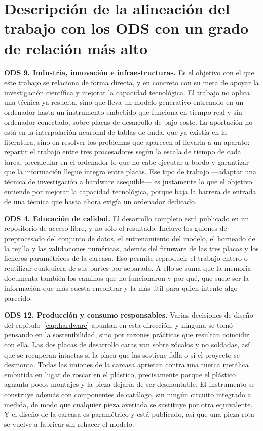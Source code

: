 \section*{Descripción de la alineación del trabajo con los ODS con un grado de
relación más alto}

\textbf{ODS 9. Industria, innovación e infraestructuras.} Es el objetivo con el
que este trabajo se relaciona de forma directa, y en concreto con su meta de
apoyar la investigación científica y mejorar la capacidad tecnológica. El
trabajo no aplica una técnica ya resuelta, sino que lleva un modelo generativo
entrenado en un ordenador hasta un instrumento embebido que funciona en tiempo
real y sin ordenador conectado, sobre placas de desarrollo de bajo coste. La
aportación no está en la interpolación neuronal de tablas de onda, que ya
existía en la literatura, sino en resolver los problemas que aparecen al
llevarla a un aparato: repartir el trabajo entre tres procesadores según la
escala de tiempo de cada tarea, precalcular en el ordenador lo que no cabe
ejecutar a bordo y garantizar que la información llegue íntegra entre placas.
Ese tipo de trabajo —adaptar una técnica de investigación a hardware asequible—
es justamente lo que el objetivo entiende por mejorar la capacidad tecnológica,
porque baja la barrera de entrada de una técnica que hasta ahora exigía un
ordenador dedicado.

\textbf{ODS 4. Educación de calidad.} El desarrollo completo está publicado en
un repositorio de acceso libre, y no sólo el resultado. Incluye los guiones de
preprocesado del conjunto de datos, el entrenamiento del modelo, el horneado de
la rejilla y las validaciones numéricas, además del firmware de las tres placas
y los ficheros paramétricos de la carcasa. Eso permite reproducir el trabajo
entero o reutilizar cualquiera de sus partes por separado. A ello se suma que la
memoria documenta también los caminos que no funcionaron y por qué, que suele
ser la información que más cuesta encontrar y la más útil para quien intente algo
parecido.

\textbf{ODS 12. Producción y consumo responsables.} Varias decisiones de diseño
del capítulo~\ref{cap:hardware} apuntan en esta dirección, y ninguna se tomó
pensando en la sostenibilidad, sino por razones prácticas que resultan coincidir
con ella. Las dos placas de desarrollo caras van sobre zócalos y no soldadas,
así que se recuperan intactas si la placa que las sostiene falla o si el
proyecto se desmonta. Todas las uniones de la carcasa aprietan contra una tuerca
metálica embutida en lugar de roscar en el plástico, precisamente porque el
plástico aguanta pocos montajes y la pieza dejaría de ser desmontable. El
instrumento se construye además con componentes de catálogo, sin ningún circuito
integrado a medida, de modo que cualquier pieza averiada se sustituye por otra
equivalente. Y el diseño de la carcasa es paramétrico y está publicado, así que
una pieza rota se vuelve a fabricar sin rehacer el modelo.
